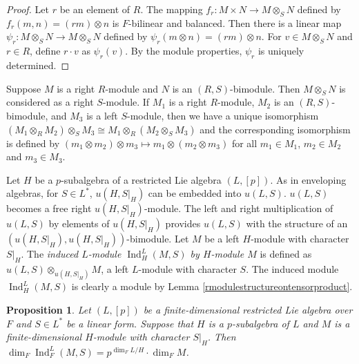\documentclass[12pt,MSc]{muthesis_2023}
\theoremstyle{plain}%
\newtheorem{Proposition}[FactCounter]{Proposition} %
\theoremstyle{definition}
\theoremstyle{remark}
\DeclareMathOperator{\Ind}{Ind}
\begin{document}
\begin{proof}
Let $r$ be an element of $R$. The mapping $f_r: M\times N \rightarrow M \otimes_S N$ defined by $f_r(m,n)=(rm)\otimes n$ is $F$-bilinear and balanced. Then there is a linear map $\psi_r: M\otimes_S N \rightarrow M \otimes_S N$ defined by $\psi_r(m\otimes n)=(rm)\otimes n$. For $v\in M\otimes_S N$ and $r\in R$, define $r\cdot v$ as $\psi_r(v)$. By the module properties, $\psi_r$ is uniquely determined.
\end{proof}

Suppose $M$ is a right $R$-module and $N$ is an $(R,S)$-bimodule. Then $M\otimes_S N$ is considered as a right $S$-module. If $M_1$ is a right $R$-module, $M_2$ is an $(R,S)$-bimodule, and $M_3$ is a left $S$-module, then we have a unique isomorphism $(M_1 \otimes_R M_2)\otimes_S M_3 \cong M_1 \otimes_R (M_2\otimes_S M_3)$ and the corresponding isomorphism is defined by $(m_1\otimes m_2)\otimes m_3\mapsto m_1\otimes(m_2\otimes m_3)$ for all $m_1\in M_1$, $m_2\in M_2$ and $m_3\in M_3$.

Let $H$ be a $p$-subalgebra of a restricted Lie algebra $(L, [p])$. As in enveloping algebras, for $S\in L^*$, $u(H, S|_H)$ can be embedded into $u(L,S)$. $u(L,S)$ becomes a free right $u(H, S|_H)$-module. The left and right multiplication of $u(L,S)$ by elements of $u(H, S|_H)$ provides $u(L,S)$ with the structure of an $(u(H, S|_H), u(H, S|_H))$-bimodule. Let $M$ be a left $H$-module with character $S|_H$. The \textit{induced $L$-module $\Ind^L_H(M,S)$ by $H$-module $M$} is defined as $u(L,S)\otimes_{u(H, S|_H)} M$, a left $L$-module with character $S$. The induced module $\Ind^L_H(M,S)$ is clearly a module by Lemma \ref{rmodulestructureontensorproduct}.

\begin{Proposition}\label{dimind}
Let $(L, [p])$ be a finite-dimensional restricted Lie algebra over $F$ and $S\in L^*$ be a linear form. Suppose that $H$ is a $p$-subalgebra of $L$ and $M$ is a finite-dimensional $H$-module with character $S|_H$. Then $\dim_F\Ind^L_F(M,S)=p^{\dim_F L/H}\cdot \dim_FM$.
\end{Proposition}
\end{document}
